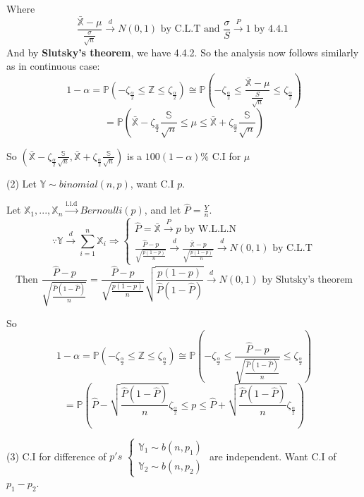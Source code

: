 Where $$\frac{\bar{\mathbb{X}}-\mu}{\frac{\sigma}{\sqrt{n}}} \overset{d}{\to} N(0, 1) \text{ by C.L.T} \text{ and } \frac{\sigma}{S} \overset{P}{\to} 1 \text{ by 4.4.1 }$$
And by \textbf{Slutsky's theorem}, we have 4.4.2. So the analysis now follows similarly as in continuous case:
$$1-\alpha = \mathbb{P}(-\zeta_{\frac{\alpha}{2}} \leq \mathbb{Z} \leq \zeta_{\frac{\alpha}{2}}) \cong 
\mathbb{P}(-\zeta_{\frac{\alpha}{2}} \leq \frac{\bar{\mathbb{X}}-\mu}{\frac{S}{\sqrt{n}}} \leq \zeta_{\frac{\alpha}{2}}) $$
$$= \mathbb{P}(\bar{\mathbb{X}}-\zeta_\frac{\alpha}{2}\frac{\mathbb{S}}{\sqrt{n}} \leq \mu \leq \bar{\mathbb{X}}+\zeta_\frac{\alpha}{2}\frac{\mathbb{S}}{\sqrt{n}})$$

So $(\bar{\mathbb{X}}-\zeta_\frac{\alpha}{2}\frac{\mathbb{S}}{\sqrt{n}}, \bar{\mathbb{X}}+\zeta_\frac{\alpha}{2}\frac{\mathbb{S}}{\sqrt{n}})$ is a $100(1-\alpha)\%$ C.I for $\mu$

(2) Let $\mathbb{Y} \sim binomial(n, p)$, want C.I $p$.

Let $\mathbb{X}_1, ..., \mathbb{X}_n \overset{\text{i.i.d}}{\to} Bernoulli(p)$, and let $\hat{P} = \frac{Y}{n}$. 
$$\because \mathbb{Y} \overset{d}{\to} \sum_{i=1}^n \mathbb{X}_i \Rightarrow
\begin{cases}
\hat{P} = \bar{\mathbb{X}} \overset{P}{\to} p \text{ by W.L.L.N} \\
\frac{\hat{P} - p}{\sqrt{\frac{p(1-p)}{n}}} \overset{d}{\to} \frac{\bar{\mathbb{X}} - p}{\sqrt{\frac{p(1-p)}{n}}} \overset{d}{\to} N(0, 1) \text{ by C.L.T}
\end{cases}$$ 
$$\text{Then } \frac{\hat{P} - p}{\sqrt{\frac{\hat{P}(1-\hat{P})}{n}}} = \frac{\hat{P} - p}{\sqrt{\frac{p(1-p)}{n}}}\sqrt{\frac{p(1-p)}{\hat{P}(1-\hat{P})}} \overset{d}{\to} N(0, 1)\text{ by Slutsky's theorem}$$

So $$1-\alpha = \mathbb{P}(-\zeta_{\frac{\alpha}{2}} \leq \mathbb{Z} \leq \zeta_{\frac{\alpha}{2}}) \cong 
\mathbb{P}(-\zeta_{\frac{\alpha}{2}} \leq \frac{\hat{P} - p}{\sqrt{\frac{\hat{P}(1-\hat{P})}{n}}} \leq \zeta_{\frac{\alpha}{2}})$$
$$= \mathbb{P}(\hat{P}-\sqrt{\frac{\hat{P}(1-\hat{P})}{n}}\zeta_{\frac{\alpha}{2}} \leq p \leq \hat{P}+\sqrt{\frac{\hat{P}(1-\hat{P})}{n}}\zeta_{\frac{\alpha}{2}})$$

(3) C.I for difference of $p's$
$\begin{cases}
\mathbb{Y}_1 \sim b(n, p_1) \\
\mathbb{Y}_2 \sim b(n, p_2)
\end{cases}$
are independent. Want C.I of $p_1 - p_2$.

